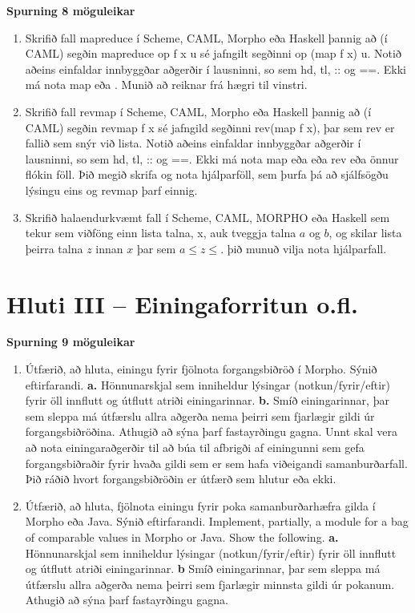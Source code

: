 \documentclass{article}
\newcommand{\bo}[1]{\textbf{#1}}
\begin{document}
\bo{Spurning 8 möguleikar}
\begin{enumerate}
    \item Skrifið fall mapreduce í Scheme, CAML, Morpho eða Haskell
    þannig að (í CAML) segðin mapreduce op f x u sé jafngilt segðinni
     op (map f x) u. Notið aðeins einfaldar innbyggðar aðgerðir í
    lausninni, so sem hd, tl, :: og ==. Ekki má nota map eða .
    Munið að  reiknar frá hægri til vinstri.

    \item Skrifið fall revmap í Scheme, CAML, Morpho eða Haskell
    þannig að (í CAML) segðin revmap f x sé jafngild segðinni
    rev(map f x), þar sem rev er fallið sem snýr við lista. Notið
    aðeins einfaldar innbyggðar aðgerðir í lausninni, so sem hd, tl, ::
    og ==. Ekki má nota map eða  eða rev eða önnur
    flókin föll. Þið megið skrifa og nota hjálparföll, sem þurfa þá að
    sjálfsögðu lýsingu eins og revmap þarf einnig.

    \item   Skrifið halaendurkvæmt fall í Scheme, CAML, MORPHO eða Haskell
    sem tekur sem viðföng einn lista talna, x, auk tveggja talna $a$ og $b$,
    og skilar lista þeirra talna $z$ innan $x$ þar sem $a \leq z \leq$. þið munuð 
    vilja nota hjálparfall.
\end{enumerate}

\newpage
\section{Hluti III – Einingaforritun o.fl.}

\bo{Spurning 9 möguleikar}
\begin{enumerate}
    \item Útfærið, að hluta, einingu fyrir fjölnota forgangsbiðröð í Morpho.
    Sýnið eftirfarandi.
        \bo{a.} Hönnunarskjal sem inniheldur lýsingar (notkun/fyrir/eftir) fyrir
    öll innflutt og útflutt atriði einingarinnar.
        \bo{b.} Smíð einingarinnar, þar sem sleppa má útfærslu allra
    aðgerða nema þeirri sem fjarlægir gildi úr forgangsbiðröðina.
    Athugið að sýna þarf fastayrðingu gagna.
    Unnt skal vera að nota einingaraðgerðir til að búa til afbrigði af
    einingunni sem gefa forgangsbiðraðir fyrir hvaða gildi sem er sem
    hafa viðeigandi samanburðarfall. Þið ráðið hvort forgangsbiðröðin er
    útfærð sem hlutur eða ekki.

    \item Útfærið, að hluta, fjölnota einingu fyrir poka samanburðarhæfra
    gilda í Morpho eða Java. Sýnið eftirfarandi.
    Implement, partially, a module for a bag of comparable values in
    Morpho or Java. Show the following.
        \bo{a.} Hönnunarskjal sem inniheldur lýsingar (notkun/fyrir/eftir) fyrir
        öll innflutt og útflutt atriði einingarinnar.
        \bo{b} Smíð einingarinnar, þar sem sleppa má útfærslu allra
        aðgerða nema þeirri sem fjarlægir minnsta gildi úr pokanum.
        Athugið að sýna þarf fastayrðingu gagna.
\end{enumerate}
\end{document}
